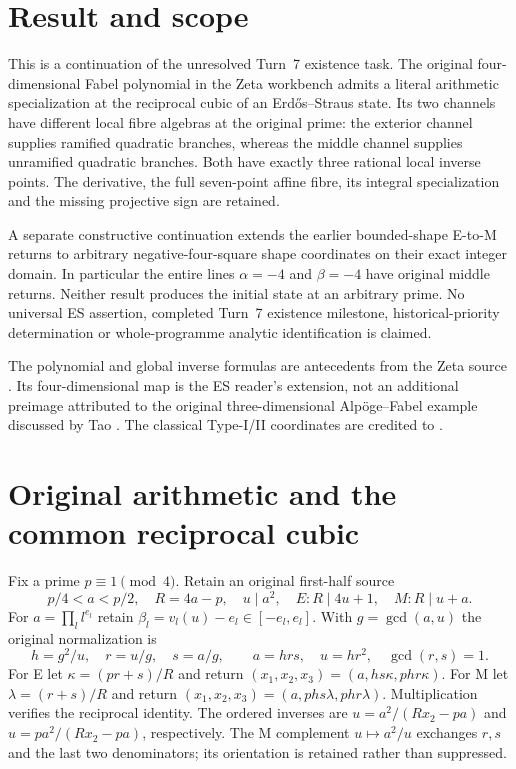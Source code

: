 \section{Result and scope}
This is a continuation of the unresolved Turn~7 existence task. The original
four-dimensional Fabel polynomial in the Zeta workbench admits a literal
arithmetic specialization at the reciprocal cubic of an Erd\H{o}s--Straus
state. Its two channels have different local fibre algebras at the original
prime: the exterior channel supplies ramified quadratic branches, whereas the
middle channel supplies unramified quadratic branches. Both have exactly three
rational local inverse points. The derivative, the full seven-point affine
fibre, its integral specialization and the missing projective sign are retained.

A separate constructive continuation extends the earlier bounded-shape E-to-M
returns to arbitrary negative-four-square shape coordinates on their exact
integer domain. In particular the entire lines $\alpha=-4$ and $\beta=-4$
have original middle returns. Neither result produces the initial state at an
arbitrary prime. No universal ES assertion, completed Turn~7 existence milestone,
historical-priority determination or whole-programme analytic identification is
claimed.

The polynomial and global inverse formulas are antecedents from the Zeta source
\cite[GF1--11, FC32--35]{Zeta}. Its four-dimensional map is the ES reader's
extension, not an additional preimage attributed to the original
three-dimensional Alp\"oge--Fabel example discussed by Tao \cite{Tao}.
The classical Type-I/II coordinates are credited to \cite[\S2]{ET}.

\section{Original arithmetic and the common reciprocal cubic}
Fix a prime $p\equiv1\pmod4$. Retain an original first-half source
\[
 p/4<a<p/2,\quad R=4a-p,\quad u\mid a^2,
 \quad E:R\mid4u+1,\quad M:R\mid u+a.
\]
For $a=\prod_l l^{e_l}$ retain $\beta_l=v_l(u)-e_l\in[-e_l,e_l]$.
With $g=\gcd(a,u)$ the original normalization is
\[
 h=g^2/u,\quad r=u/g,\quad s=a/g,\qquad
 a=hrs,\quad u=hr^2,\quad\gcd(r,s)=1.
\]
For E let $\kappa=(pr+s)/R$ and return
$(x_1,x_2,x_3)=(a,hs\kappa,phr\kappa)$.
For M let $\lambda=(r+s)/R$ and return
$(x_1,x_2,x_3)=(a,phs\lambda,phr\lambda)$.
Multiplication verifies the reciprocal identity. The ordered inverses are
$u=a^2/(Rx_2-pa)$ and $u=pa^2/(Rx_2-pa)$, respectively. The M complement
$u\mapsto a^2/u$ exchanges $r,s$ and the last two denominators; its orientation
is retained rather than suppressed.

